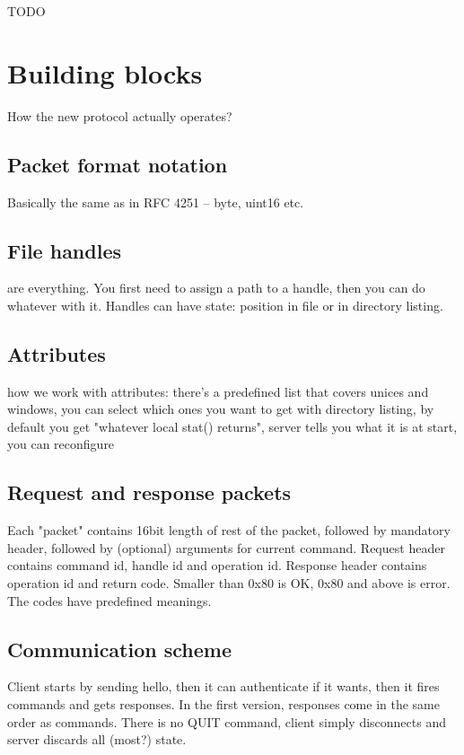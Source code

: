TODO


\section{Building blocks}

How the new protocol actually operates?

\subsection{Packet format notation}

Basically the same as in RFC 4251 -- byte, uint16 etc.

\subsection{File handles}

are everything. You first need to assign a path to a handle, then you can do whatever with it. Handles can
have state: position in file or in directory listing.

\subsection{Attributes}

how we work with attributes: there's a predefined list that covers unices and windows, you can select which
ones you want to get with directory listing, by default you get "whatever local stat() returns", server tells
you what it is at start, you can reconfigure

\subsection{Request and response packets}

Each "packet" contains 16bit length of rest of the packet, followed by mandatory header, followed by
(optional) arguments for current command. Request header contains command id, handle id and operation id.
Response header contains operation id and return code. Smaller than 0x80 is OK, 0x80 and above is error. The
codes have predefined meanings.

\subsection{Communication scheme}

Client starts by sending hello, then it can authenticate if it wants, then it fires commands and gets
responses. In the first version, responses come in the same order as commands. There is no QUIT command,
client simply disconnects and server discards all (most?) state.

